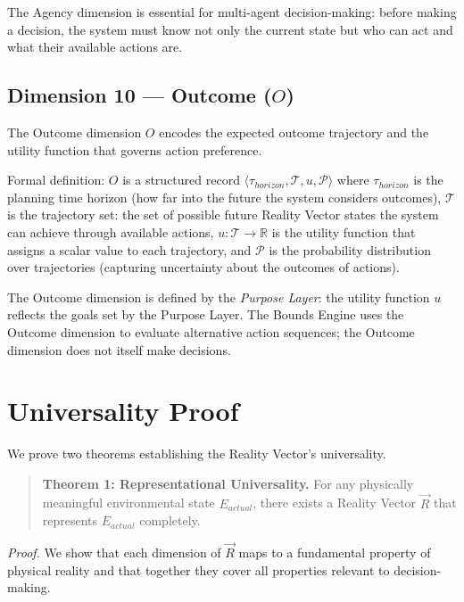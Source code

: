 \documentclass[12pt]{article}
\newcommand{\purpose}{\textit{Purpose Layer}}
\begin{document}
The Agency dimension is essential for multi-agent decision-making: before making a decision, the system must know not only the current state but who can act and what their available actions are.

\subsection{Dimension 10 --- Outcome ($O$)}
\label{sec:outcome}

The Outcome dimension $O$ encodes the expected outcome trajectory and the utility function that governs action preference.

Formal definition: $O$ is a structured record $\langle \tau_{horizon}, \mathcal{T}, u, \mathcal{P} \rangle$ where $\tau_{horizon}$ is the planning time horizon (how far into the future the system considers outcomes), $\mathcal{T}$ is the trajectory set: the set of possible future Reality Vector states the system can achieve through available actions, $u: \mathcal{T} \rightarrow \mathbb{R}$ is the utility function that assigns a scalar value to each trajectory, and $\mathcal{P}$ is the probability distribution over trajectories (capturing uncertainty about the outcomes of actions).

The Outcome dimension is defined by the \purpose: the utility function $u$ reflects the goals set by the Purpose Layer. The Bounds Engine uses the Outcome dimension to evaluate alternative action sequences; the Outcome dimension does not itself make decisions.

\section{Universality Proof}
\label{sec:proofs}

We prove two theorems establishing the Reality Vector's universality.

\begin{quote}
\textbf{Theorem 1: Representational Universality.}
For any physically meaningful environmental state $E_{actual}$, there exists a Reality Vector $\vec{R}$ that represents $E_{actual}$ completely.
\end{quote}

\textit{Proof.} We show that each dimension of $\vec{R}$ maps to a fundamental property of physical reality and that together they cover all properties relevant to decision-making.
\end{document}
